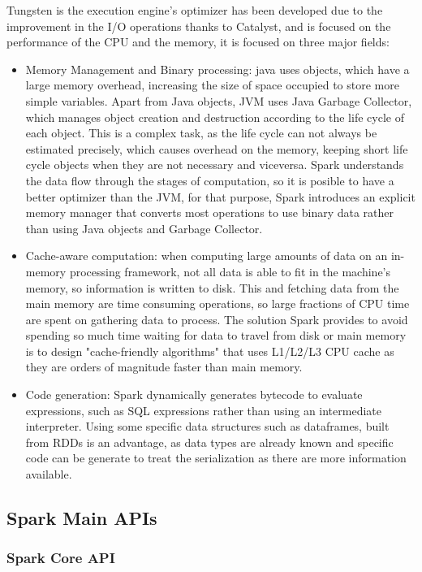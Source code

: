 \documentclass[11pt]{book} %
\begin{document}
        Tungsten is the execution engine's optimizer has been developed due to the improvement in the I/O operations thanks to Catalyst, and is focused on the performance of the CPU and the memory, it is focused on three major fields:

        \begin{itemize}
          \item Memory Management and Binary processing: java uses objects, which have a large memory overhead, increasing the size of space occupied to store more simple variables. Apart from Java objects, JVM uses Java Garbage Collector, which manages object creation and destruction according to the life cycle of each object. This is a complex task, as the life cycle can not always be estimated precisely, which causes overhead on the memory, keeping short life cycle objects when they are not necessary and viceversa. Spark understands the data flow through the stages of computation, so it is posible to have a better optimizer than the JVM, for that purpose, Spark introduces an explicit memory manager that converts most operations to use binary data rather than using Java objects and Garbage Collector.
          \item Cache-aware computation: when computing large amounts of data on an in-memory processing framework, not all data is able to fit in the machine's memory, so information is written to disk. This and fetching data from the main memory are time consuming operations, so large fractions of CPU time are spent on gathering data to process. The solution Spark provides to avoid spending so much time waiting for data to travel from disk or main memory is to design "cache-friendly algorithms" that uses L1/L2/L3 CPU cache as they are orders of magnitude faster than main memory.
          \item Code generation: Spark dynamically generates bytecode to evaluate expressions, such as SQL expressions rather than using an intermediate interpreter. Using some specific data structures such as dataframes, built from RDDs is an advantage, as data types are already known and specific code can be generate to treat the serialization as there are more information available.
        \end{itemize}


      \subsection{Spark Main APIs}

        \subsubsection{Spark Core API}
\end{document}
